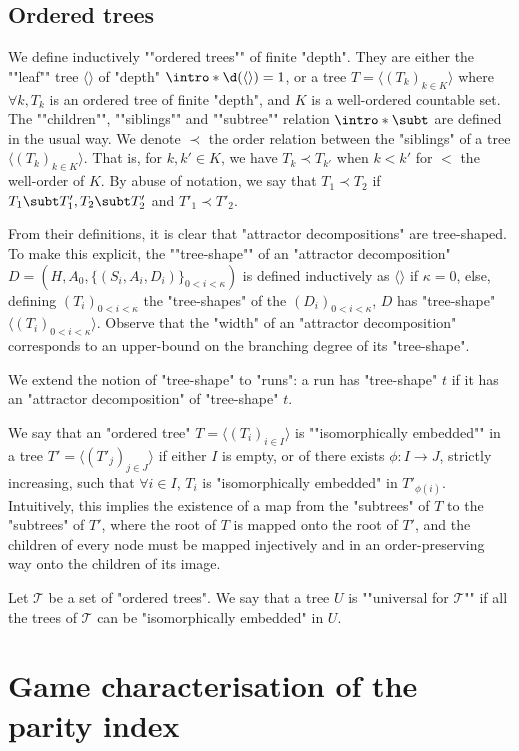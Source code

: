 \documentclass[a4paper,UKenglish,cleveref, autoref, thm-restate]{lipics-v2021}
\newcommand{\T}{\mathcal{T}}
\begin{document}
 
 \subsection{Ordered trees}

 \AP We define inductively ""ordered trees"" of finite "depth". 
 They are either the ""leaf"" tree $\langle \rangle$ of "depth" $\intro*\d(\langle\rangle) = 1$, or a tree $T = \langle (T_k)_{k\in K} \rangle$ 
 where $\forall k, T_k$ is an ordered tree of finite "depth", and $K$ is a well-ordered countable set. 
 The ""children"", ""siblings"" and ""subtree"" relation $\intro*\subt$ are defined in the usual way.
 We denote $\prec$ the order relation between the "siblings" of a tree $\langle (T_k)_{k\in K} \rangle$. That is, for $k,k' \in K$, we have $T_k \prec T_{k'}$ when $k < k'$ for $<$ the well-order of $K$.  By abuse of notation, we say that $T_1 \prec T_2$ if $T_1\subt T'_1, T_2 \subt T'_2$ and $T'_1 \prec T'_2$.
 
 \AP From their definitions, it is clear that "attractor decompositions" are tree-shaped. To make this explicit, the ""tree-shape"" of an "attractor decomposition" $D= (H,A_0,\{(S_i,A_i,D_i)\}_{0<i<\kappa})$ is defined inductively as $\langle\rangle$ if $\kappa= 0$, else, defining $(T_i)_{0<i<\kappa}$ the "tree-shapes" of the $(D_i)_{0<i<\kappa}$, $D$ has "tree-shape" $\langle (T_i)_{0<i<\kappa}\rangle$.
 Observe that the "width" of an "attractor decomposition" corresponds to an upper-bound on the branching degree of its "tree-shape".
 
 \AP We extend the notion of "tree-shape" to "runs": a run has "tree-shape" $t$ if it has an "attractor decomposition" of "tree-shape" $t$.
 
\AP We say that an "ordered tree" $T = \langle (T_i)_{i\in I}\rangle$ is ""isomorphically embedded"" in a tree $T' = \langle (T'_j)_{j\in J}\rangle$ if either $I$ is empty, or of there exists $\phi: I \to J$, strictly increasing, such that $\forall i \in I$, $T_i$ is "isomorphically embedded" in $T'_{\phi(i)}$.
Intuitively, this implies the existence of a map from the "subtrees" of $T$ to the "subtrees" of $T'$, where the root of $T$ is mapped onto the root of $T'$, and the children of every node must be mapped injectively and in an order-preserving way onto the children of its image.

\AP Let $\T$ be a set of "ordered trees". We say that a tree $U$ is ""universal for $\T$"" if all the trees of $\T$ can be "isomorphically embedded" in $U$. 

\section{Game characterisation of the parity index}\label{sec:register-game}
\end{document}
